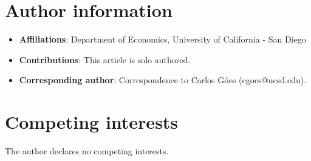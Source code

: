 \documentclass{article}
\theoremstyle{lemma}
\begin{document}
\printbibliography

\appendix

\section{Author information}

\begin{itemize}
    \item \textbf{Affiliations}: Department of Economics, University of California - San Diego
    \item \textbf{Contributions}: This article is solo authored.
    \item \textbf{Corresponding author}: Correspondence to Carlos Góes (cgoes@ucsd.edu).
\end{itemize}


\section{Competing interests}
The author declares no competing interests.
\end{document}
